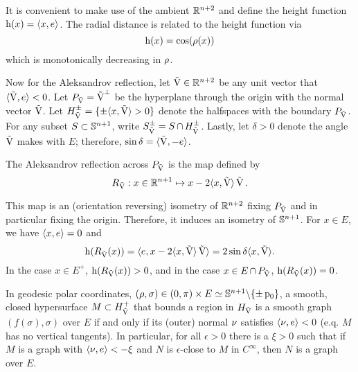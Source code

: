\documentclass{amsart}
\begin{document}
It is convenient to make use of the ambient \(\R^{n+2}\) and define the height function \(\height(x) = \ip{x}{\vertvec}\). The radial distance is related to the height function via
\[
\height(x) = \cos(\radialdistance(x))
\]
which is monotonically decreasing in \(\radialdistance\).

Now for the Aleksandrov reflection, let \(\reflectionvector \in \R^{n+2}\) be any unit vector that \(\ip{\reflectionvector}{\vertvec} < 0\). Let \(\reflectionplane = \reflectionvector^{\perp}\) be the hyperplane through the origin with the normal vector \(\reflectionvector\). Let \(\reflectionhalfspace^{\pm} = \{\pm \ip{x}{\reflectionvector} > 0\}\) denote the halfspaces with the boundary \(\reflectionplane\). For any subset \(S \subset \S^{n+1}\), write \(\reflectionset{S}^{\pm} = S \intersect \reflectionhalfspace^{\pm}\). Lastly, let \(\delta > 0\) denote the angle \(\reflectionvector\) makes with \(E\); therefore, \(\sin \delta = \ip{\reflectionvector}{-\vertvec}\).

\begin{definition}
The Aleksandrov reflection across \(\reflectionplane\) is the map defined by
\[
\reflectionmap: x \in \R^{n+1} \mapsto x - 2\ip{x}{\reflectionvector} \reflectionvector.
\]
\end{definition}

This map is an (orientation reversing) isometry of \(\R^{n+2}\) fixing \(\reflectionplane\) and in particular fixing the origin. Therefore, it induces an isometry of \(\S^{n+1}\). For \(x \in E\), we have \(\ip{x}{\vertvec} = 0\) and
\[
\height(\reflectionmap(x)) = \ip{\vertvec}{x - 2 \ip{x}{\reflectionvector} \reflectionvector} = 2 \sin\delta \ip{x}{\reflectionvector}.
\]
In the case \(x \in E^+\), \(\height(\reflectionmap(x)) > 0\), and in the case \(x \in E \intersect \reflectionplane\), \(\height(\reflectionmap(x)) = 0\).

In geodesic polar coordinates, \((\radialdistance, \sigma) \in (0, \pi) \times E \simeq \S^{n+1}\backslash \{\pm \basepoint\}\), a smooth, closed hypersurface \(M \subset \reflectionhalfspace^+\) that bounds a region in \(\reflectionhalfspace\) is a smooth graph \((f(\sigma), \sigma)\) over \(E\) if and only if its (outer) normal \(\nor\) satisfies \(\ip{\nor}{\vertvec} < 0\) (e.q. \(M\) has no vertical tangents). In particular, for all \(\epsilon>0\) there is a \(\xi>0\) such that if \(M\) is a graph with \(\ip{\nor}{\vertvec} < -\xi\) and \(N\) is \(\epsilon\)-close to \(M\) in \(C^{\infty}\), then \(N\) is a graph over \(E\).
\end{document}
